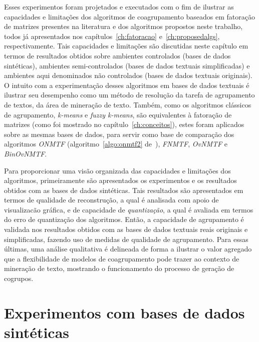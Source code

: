 \documentclass[
    12pt,                %
    oneside,            %
    a4paper,            %
    english,            %
    brazil                %
    ]{abntex2ppgsi}
\begin{document}
Esses experimentos foram projetados e executados com o fim de ilustrar as capacidades e limitações dos algoritmos de coagrupamento baseados em fatoração de matrizes presentes na literatura e dos algoritmos propostos neste trabalho, todos já apresentados nos capítulos~\ref{ch:fatoracao} e~\ref{ch:proposedalgs}, respectivamente.
Tais capacidades e limitações são discutidas neste capítulo em termos de resultados obtidos sobre ambientes controlados (bases de dados sintéticas), ambientes semi-controlados (bases de dados textuais simplificadas) e ambientes aqui denominados não controlados (bases de dados textuais originais).
O intuito com a experimentação desses algoritmos em bases de dados textuais é ilustrar seu desempenho como um método de resolução da tarefa de agrupamento de textos, da área de mineração de texto.
Também, como os algoritmos clássicos de agrupamento, \textit{k-means} e \textit{fuzzy k-means}, são equivalentes à fatoração de matrizes (como foi mostrado no capítulo~\ref{ch:conceitos}), estes foram aplicados sobre as mesmas bases de dados, para servir como base de comparação dos algoritmos \textit{ONMTF} (algoritmo~\ref{algo:onmtf2} de~), \textit{FNMTF}, \textit{OvNMTF} e \textit{BinOvNMTF}.


Para proporcionar uma visão organizada das capacidades e limitações dos algoritmos, primeiramente são apresentados os experimentos e os resultados obtidos com as bases de dados sintéticas.
Tais resultados são apresentados em termos de qualidade de reconstrução, a qual é analisada com apoio de visualizacão gráfica, e de capacidade de \textit{quantização}, a qual é avaliada em termos do erro de quantização dos algoritmos.
Então, a capacidade de agrupamento é validada nos resultados obtidos com as bases de dados textuais reais originais e simplificadas, fazendo uso de medidas de qualidade de agrupamento.
Para essas últimas, uma análise qualitativa é delineada de forma a ilustrar o valor agregado que a flexibilidade de modelos de coagrupamento pode trazer ao contexto de mineração de texto, mostrando o funcionamento do processo de geração de cogrupos.

\section{Experimentos com bases de dados sintéticas}
\label{sec:experiments:synthetic}
\end{document}
